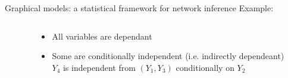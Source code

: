 \documentclass[9pt]{beamer}
\newcommand{\edgeunit}{1.5}
\newcommand{\emphase}[1]{\textcolor{Complement}{#1}}
\newcommand{\bleu}[1]{\textcolor{Framableulight}{#1}}
\begin{document}
\begin{frame}{Graphical models: a statistical framework for network inference}
\bleu{Example}:\bigskip
\begin{columns}
\begin{column}{0.3\linewidth}\hspace{0.5cm}
\\
\end{column}
\begin{column}{0.5\linewidth}
	\begin{itemize}
	\item All variables are dependant \bigskip
	\item Some are \emphase{conditionally independent} (i.e. indirectly dependeant)\\\bigskip
	 $Y_4$ is independent from $(Y_1, Y_3)$ conditionally on $Y_2$
\end{itemize}
\end{column}
\end{columns}

\end{frame}
\end{document}
